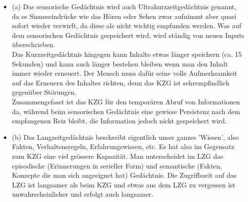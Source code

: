 
\begin{itemize}

    \item (a) Das sensorische Gedächtnis wird auch Ultrakurzzeitgedächtnis genannt, da es Sinneseindrücke wie
das Hören oder Sehen zwar aufnimmt aber quasi sofort wieder verwirft, da diese als nicht
wichtig empfunden werden. Was auf dem sensorischen Gedächtnis gespeichert wird, wird 
ständig von neuen Inputs überschrieben. \\
Das Kurzzeitgedächtnis hingegen kann Inhalte etwas länger speichern (ca. 15 Sekunden) und kann auch
länger bestehen bleiben wenn man den Inhalt immer wieder erneuert. Der Mensch muss dafür
seine volle Aufmerksamkeit auf das Erneuern des Inhaltes richten, denn das KZG ist sehrempfindlich
gegenüber Störungen.  \\
Zusammengefasst ist das KZG für den temporären Abruf von Informationen da, 
während beim sensorischen Gedächtnis eine gewisse Persistenz nach dem empfangenen Reiz bleibt, 
die Information jedoch nicht gespeichert wird. 

    \item (b) Das Langzeitgedächtnis beschreibt eigentlich unser ganzes 'Wissen', also Fakten, Verhaltensregeln,
Erfahrungswissen, etc. Es hat also im Gegensatz zum KZG eine viel grössere
Kapazität. Man unterscheidet im LZG das episodische (Erinnerungen in serieller Form) und
semantische (Fakten, Konzepte die man sich angeeignet hat) Gedächtnis. Die Zugriffszeit auf das LZG
ist langsamer als beim KZG und etwas aus dem LZG zu vergessen ist unwahrscheinlicher und erfolgt
auch langsamer.
    
\end{itemize}

 
 

